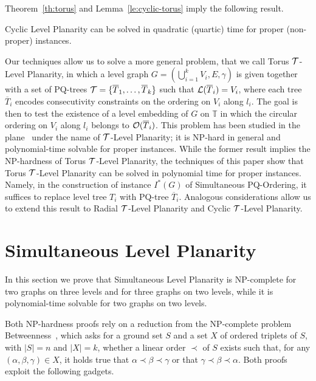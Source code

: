 \documentclass{llncs}
\newcommand{\NPC}{\mbox{NP-complete}\xspace}
\begin{document}
Theorem~\ref{th:torus} and Lemma~\ref{le:cyclic-torus} imply the following result.

\begin{theorem}\label{co:cyclicLevel-polynomial}
{\sc Cyclic Level Planarity} can be solved in quadratic (quartic) time for proper (non-proper) instances.
\end{theorem}



Our techniques allow us to solve a more general problem, that we call {\sc Torus $\cal T$-Level Planarity}, in which a level graph $G=(\bigcup^k_{i=1} V_i,E,\gamma)$ is given together with a set of PQ-trees ${\cal T}=\{\overline{T}_1,\dots,\overline{T}_k\}$ such that ${\cal L}(\overline{T}_i)= V_i$, where each tree $\overline{T}_i$ encodes consecutivity constraints on the ordering on $V_i$ along $l_i$. The goal is then to test the existence of a level embedding of $G$ on $\mathbb T$ in which the circular ordering on $V_i$ along $l_i$ belongs to ${\cal O} (\overline{T}_i)$. 
This problem has been studied in the plane~\cite{tibp-addfr-15,wsp-gktlg-12} under the name of {\sc $\cal T$-Level Planarity}; it is NP-hard in general and polynomial-time solvable for proper instances. While the former result implies the NP-hardness of {\sc Torus $\cal T$-Level Planarity}, the techniques of this paper show that {\sc Torus $\cal T$-Level Planarity} can be solved in polynomial time for proper instances. Namely, in the construction of instance $I^*(G)$ of {\sc Simultaneous PQ-Ordering}, it suffices to replace level tree $T_i$ with PQ-tree $\overline{T}_i$. Analogous considerations allow us to extend this result to {\sc Radial $\cal T$-Level Planarity} and {\sc Cyclic $\cal T$-Level Planarity}.

\section{Simultaneous Level Planarity} \label{se:simultaneous}

In this section we prove that  {\sc Simultaneous Level Planarity} is \NPC for two graphs on three levels and for three graphs on two levels, while it is polynomial-time solvable for two graphs on two levels. 

Both NP-hardness proofs rely on a reduction from the \NPC problem {\sc Betweenness}~\cite{o-top-79}, which asks for a ground set $S$ and a set $X$ of ordered triplets of $S$, with $|S|=n$ and $|X|=k$, whether a linear order $\prec$ of $S$ exists such that, for any $(\alpha,\beta,\gamma) \in X$, it holds true that $\alpha \prec \beta \prec \gamma$ or that $\gamma \prec \beta \prec \alpha$. Both proofs exploit the following gadgets. 
\end{document}
